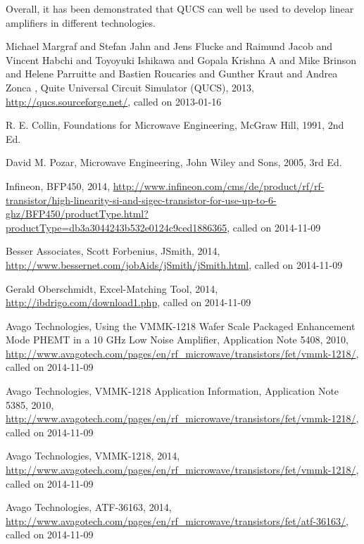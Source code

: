 Overall, it has been demonstrated that QUCS can well be used to
develop linear amplifiers in different technologies. 


\begin{thebibliography}{1}
	 { Michael Margraf and Stefan Jahn and Jens Flucke and Raimund Jacob and Vincent Habchi and Toyoyuki Ishikawa and Gopala Krishna A  and Mike Brinson  and Helene Parruitte and Bastien Roucaries and  Gunther Kraut and Andrea Zonca },	 {Quite Universal Circuit Simulator (QUCS)},
   {2013},
   \url{http://qucs.sourceforge.net/},
   {called on 2013-01-16}

 {R. E. Collin},
 {Foundations for Microwave Engineering},
 {McGraw Hill},
 1991,
 2nd Ed.


  {David M. Pozar},
   {Microwave Engineering},
  {John Wiley and Sons},
  2005,
  3rd Ed.

  {Infineon},
  {BFP450},
  {2014},
  \url{http://www.infineon.com/cms/de/product/rf/rf-transistor/high-linearity-si-and-sigec-transistor-for-use-up-to-6-ghz/BFP450/productType.html?productType=db3a3044243b532e0124c9ced1886365},
  {called on 2014-11-09}


  {Besser Associates}, 
  {Scott Forbenius},
  {JSmith},
  {2014},
  \url{http://www.bessernet.com/jobAids/jSmith/jSmith.html},
  {called on 2014-11-09}


  {Gerald Oberschmidt},
  {Excel-Matching Tool},
  {2014},
  \url{http://ibdrigo.com/download1.php},
  {called on 2014-11-09}


  {Avago Technologies},
  {Using the VMMK-1218 Wafer Scale Packaged Enhancement Mode PHEMT 
in a 10 GHz Low Noise Amplifier, Application Note 5408},
  {2010},
  \url{http://www.avagotech.com/pages/en/rf_microwave/transistors/fet/vmmk-1218/},
  {called on 2014-11-09}


  {Avago Technologies},
  {VMMK-1218 Application Information, Application Note 5385},
  {2010},
  \url{http://www.avagotech.com/pages/en/rf_microwave/transistors/fet/vmmk-1218/},
  {called on 2014-11-09}


  {Avago Technologies},
  {VMMK-1218},
  {2014},
  \url{http://www.avagotech.com/pages/en/rf_microwave/transistors/fet/vmmk-1218/},
  {called on 2014-11-09}


  {Avago Technologies},
  {ATF-36163},
  {2014},
  \url{http://www.avagotech.com/pages/en/rf_microwave/transistors/fet/atf-36163/},
  {called on 2014-11-09}


\end{thebibliography}
